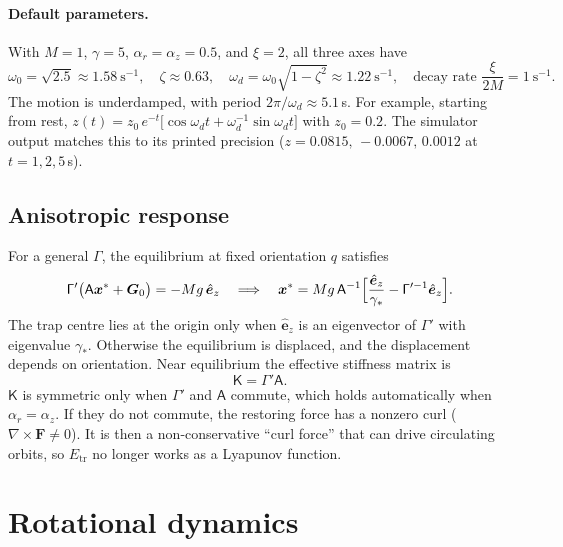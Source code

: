 \documentclass[11pt]{article}
\newcommand{\vect}[1]{\bm{#1}}
\newcommand{\tens}[1]{\mathsf{#1}}
\newcommand{\ez}{\hat{\vect{e}}_z}
\newcommand{\Gl}{\vect{G}}
\theoremstyle{remark}
\begin{document}
\paragraph{Default parameters.} With $M=1$, $\gamma=5$,
$\alpha_r=\alpha_z=0.5$, and $\xi=2$, all three axes have
\begin{equation}
  \omega_0=\sqrt{2.5}\approx1.58~\text{s}^{-1},\quad
  \zeta\approx0.63,\quad
  \omega_d=\omega_0\sqrt{1-\zeta^2}\approx1.22~\text{s}^{-1},\quad
  \text{decay rate } \frac{\xi}{2M}=1~\text{s}^{-1}.
\end{equation}
The motion is underdamped, with period $2\pi/\omega_d\approx5.1$\,s. For
example, starting from rest,
$z(t)=z_0\,e^{-t}\bigl[\cos\omega_d t+\omega_d^{-1}\sin\omega_d t\bigr]$
with $z_0=0.2$. The simulator output matches this to its printed precision
($z=0.0815,\,-0.0067,\,0.0012$ at $t=1,2,5$\,s).

\subsection{Anisotropic response}

For a general $\tens{\Gamma}$, the equilibrium at fixed orientation $q$
satisfies
\begin{equation}
  \tens{\Gamma}'\bigl(\tens{A}\vect{x}^\ast + \Gl_0\bigr) = -Mg\,\ez
  \quad\Longrightarrow\quad
  \vect{x}^\ast = Mg\,\tens{A}^{-1}\Bigl[\frac{\ez}{\gamma_\ast}
                 - \tens{\Gamma}'^{-1}\ez\Bigr].
\end{equation}
The trap centre lies at the origin only when $\ez$ is an eigenvector of
$\tens{\Gamma}'$ with eigenvalue $\gamma_\ast$. Otherwise the equilibrium
is displaced, and the displacement depends on orientation. Near
equilibrium the effective stiffness matrix is
\begin{equation}
  \tens{K} = \tens{\Gamma}'\tens{A}.
\end{equation}
$\tens{K}$ is symmetric only when $\tens{\Gamma}'$ and $\tens{A}$ commute,
which holds automatically when $\alpha_r=\alpha_z$. If they do not
commute, the restoring force has a nonzero curl
($\nabla\times\vect{F}\neq0$). It is then a non-conservative ``curl
force'' that can drive circulating orbits, so $E_{\text{tr}}$ no longer
works as a Lyapunov function.

\section{Rotational dynamics}
\end{document}
